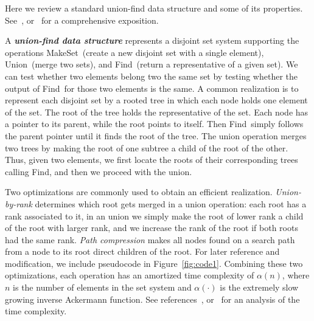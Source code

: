 \documentclass[a4paper,11pt]{article}
\def\find{\mbox{\sc Find}}
\def\union{\mbox{\sc Union}}
\def\makeset{\mbox{\sc MakeSet}}
\def\DEF#1{\textbf{\emph{#1}}}
\begin{document}
Here we review a standard union-find data structure and some of its properties.
See~\cite[Chapter 21]{cormen}, \cite[Chapter 5]{dpv} or~\cite{e-14} for a comprehensive exposition.

A \DEF{union-find data structure} represents a disjoint set system supporting
the operations \makeset\ (create a new disjoint set with a single element), \union\
(merge two sets), and \find\ (return a representative of a given set). 
We can test whether two elements belong two the same set by testing whether the output
of \find\ for those two elements is the same.
A common realization
is to represent each disjoint set by a rooted tree in which each node holds one element of the set.
The root of the tree holds the representative of the set. Each node has a pointer to its parent,
while the root points to itself.
Then \find\ simply follows the parent pointer until it finds the root of the tree.
The union operation merges two trees by making the root of one subtree a child of the root of the other.
Thus, given two elements, we first locate the roots of their corresponding trees calling \find,
and then we proceed with the union.

Two optimizations are commonly used to obtain an efficient realization. 
\emph{Union-by-rank} determines which root gets merged in a union operation: 
each root has a rank associated to it, in an union we simply make the root of lower rank a child
of the root with larger rank, and we increase the rank of the root if both roots had the same rank. 
\emph{Path compression} makes all nodes found on a search path 
from a node to its root direct children of the root. 
For later reference and modification, 
we include pseudocode in Figure~\ref{fig:code1}.
Combining these two optimizations, each operation has an amortized time
complexity of $\alpha(n)$, where $n$ is the number of elements in the set system and
$\alpha(\cdot)$ is the extremely slow growing inverse Ackermann function.
See references~\cite[Chapter 21]{cormen}, \cite{e-14} or~\cite{ss-05} 
for an analysis of the time complexity.
\end{document}
